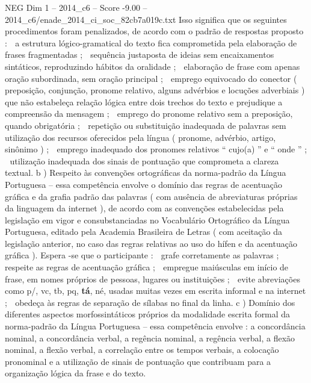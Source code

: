 \begin{textsample}{NEG Dim 1 – 2014\_c6 – Score -9.00 – 2014\_c6/enade\_2014\_ci\_soc\_82cb7a019c.txt}
Isso significa que os seguintes procedimentos foram penalizados, de acordo com o padrão de respostas proposto :  a estrutura lógico-gramatical do texto fica comprometida pela elaboração de frases fragmentadas ;  sequência justaposta de ideias sem encaixamentos sintáticos, reproduzindo hábitos da oralidade ;  elaboração de frase com apenas oração subordinada, sem oração principal ;  emprego equivocado do conector ( preposição, conjunção, pronome relativo, alguns advérbios e locuções adverbiais ) que não estabeleça relação lógica entre dois trechos do texto e prejudique a compreensão da mensagem ;  emprego do pronome relativo sem a preposição, quando obrigatória ;  repetição ou substituição inadequada de palavras sem utilização dos recursos oferecidos pela língua ( pronome, advérbio, artigo, sinônimo ) ;  emprego inadequado dos pronomes relativos “ cujo(a) ” e “ onde ” ;  utilização inadequada dos sinais de pontuação que comprometa a clareza textual. b ) Respeito às convenções ortográficas da norma-padrão da Língua Portuguesa – essa competência envolve o domínio das regras de acentuação gráfica e da grafia padrão das palavras ( com ausência de abreviaturas próprias da linguagem da internet ), de acordo com as convenções estabelecidas pela legislação em vigor e consubstanciadas no Vocabulário Ortográfico da Língua Portuguesa, editado pela Academia Brasileira de Letras ( com aceitação da legislação anterior, no caso das regras relativas ao uso do hífen e da acentuação gráfica ).
Espera -se que o participante :  grafe corretamente as palavras ;  respeite as regras de acentuação gráfica ;  empregue maiúsculas em início de frase, em nomes próprios de pessoas, lugares ou instituições ;  evite abreviações como p/, vc, tb, pq, \textbf{tá}, né, usadas muitas vezes em escrita informal e na internet ;  obedeça às regras de separação de sílabas no final da linha. c ) Domínio dos diferentes aspectos morfossintáticos próprios da modalidade escrita formal da norma-padrão da Língua Portuguesa – essa competência envolve : a concordância nominal, a concordância verbal, a regência nominal, a regência verbal, a flexão nominal, a flexão verbal, a correlação entre os tempos verbais, a colocação pronominal e a utilização de sinais de pontuação que contribuam para a organização lógica da frase e do texto.

\end{textsample}
